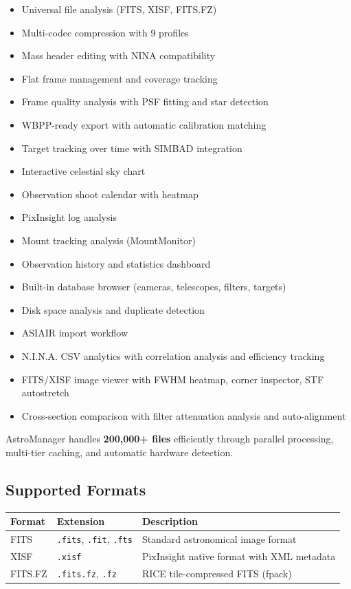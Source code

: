 \documentclass[11pt,a4paper]{article}
\begin{document}
\begin{itemize}
    \item Universal file analysis (FITS, XISF, FITS.FZ)
    \item Multi-codec compression with 9 profiles
    \item Mass header editing with NINA compatibility
    \item Flat frame management and coverage tracking
    \item Frame quality analysis with PSF fitting and star detection
    \item WBPP-ready export with automatic calibration matching
    \item Target tracking over time with SIMBAD integration
    \item Interactive celestial sky chart
    \item Observation shoot calendar with heatmap
    \item PixInsight log analysis
    \item Mount tracking analysis (MountMonitor)
    \item Observation history and statistics dashboard
    \item Built-in database browser (cameras, telescopes, filters, targets)
    \item Disk space analysis and duplicate detection
    \item ASIAIR import workflow
    \item N.I.N.A. CSV analytics with correlation analysis and efficiency tracking
    \item FITS/XISF image viewer with FWHM heatmap, corner inspector, STF autostretch
    \item Cross-section comparison with filter attenuation analysis and auto-alignment
\end{itemize}

AstroManager handles \textbf{200,000+ files} efficiently through parallel processing, multi-tier caching, and automatic hardware detection.

\subsection{Supported Formats}

\begin{center}
\begin{tabular}{llp{7cm}}
\toprule
\textbf{Format} & \textbf{Extension} & \textbf{Description} \\
\midrule
FITS & \texttt{.fits}, \texttt{.fit}, \texttt{.fts} & Standard astronomical image format \\
XISF & \texttt{.xisf} & PixInsight native format with XML metadata \\
FITS.FZ & \texttt{.fits.fz}, \texttt{.fz} & RICE tile-compressed FITS (fpack) \\
\bottomrule
\end{tabular}
\end{center}
\end{document}
